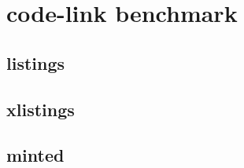 \documentclass{article}
\begin{document}
\section*{code-link benchmark}
\subsection*{listings}

\subsection*{xlistings}

\subsection*{minted}

\end{document}
